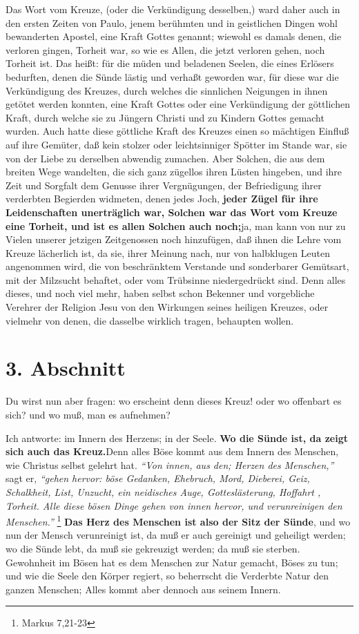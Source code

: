 Das Wort vom Kreuze, (oder die Verkündigung desselben,) ward daher auch in den
ersten Zeiten von Paulo, jenem berühmten und in geistlichen Dingen wohl
bewanderten Apostel, eine Kraft Gottes genannt; wiewohl es damals denen, die
verloren gingen, Torheit war, so wie es Allen, die jetzt verloren gehen, noch
Torheit ist. Das heißt: für die müden und beladenen Seelen, die eines Erlösers
bedurften, denen die Sünde lästig und verhaßt geworden war, für diese war die
Verkündigung des Kreuzes, durch welches die sinnlichen Neigungen in ihnen
getötet werden konnten, eine Kraft Gottes oder eine Verkündigung der göttlichen
Kraft, durch welche sie zu Jüngern Christi und zu Kindern Gottes gemacht wurden.
Auch hatte diese göttliche Kraft des Kreuzes einen so mächtigen Einfluß auf ihre
Gemüter, daß kein stolzer oder leichtsinniger Spötter im Stande war, sie von
der Liebe zu derselben abwendig zumachen. Aber Solchen, die aus dem breiten Wege
wandelten, die sich ganz zügellos ihren Lüsten hingeben, und ihre Zeit und
Sorgfalt dem Genusse ihrer Vergnügungen, der Befriedigung ihrer verderbten
Begierden widmeten, denen jedes Joch, \textbf{jeder Zügel für ihre Leidenschaften
unerträglich war, Solchen war das Wort vom Kreuze eine Torheit, und ist es
allen Solchen auch noch;}ja, man kann von nur zu Vielen unserer jetzigen
Zeitgenossen noch hinzufügen, daß ihnen die Lehre vom Kreuze lächerlich ist, da
sie, ihrer Meinung nach, nur von halbklugen Leuten angenommen wird, die von
beschränktem Verstande und sonderbarer Gemütsart, mit der Milzsucht
 behaftet,
oder vom Trübsinne niedergedrückt sind. Denn alles dieses, und noch viel mehr,
haben selbst schon Bekenner und vorgebliche Verehrer der Religion Jesu von den
Wirkungen seines heiligen Kreuzes, oder vielmehr von denen, die dasselbe
wirklich tragen, behaupten wollen.

\section{3. Abschnitt} \label{kap3_ab3} 

Du wirst nun aber fragen: wo erscheint denn dieses Kreuz! oder wo offenbart es
sich? und wo muß, man es aufnehmen?

Ich antworte: im Innern des Herzens; in der Seele. \textbf{Wo die Sünde ist, da zeigt
sich auch das Kreuz.}Denn alles Böse kommt aus dem Innern des Menschen, wie
Christus selbst gelehrt hat.
\textit{"`Von innen, aus den; Herzen des Menschen,"'} sagt er,
\textit{"`gehen hervor: böse Gedanken, Ehebruch, Mord, Dieberei, Geiz, Schalkheit,
List, Unzucht, ein neidisches Auge, Gotteslästerung, Hoffahrt%
, Torheit. Alle
diese bösen Dinge gehen von innen hervor, und verunreinigen den
Menschen."'}
\footnote{Markus 7,21-23}
\textbf{Das Herz des Menschen ist also der Sitz der Sünde},
 und wo nun der Mensch
verunreinigt ist, da muß er auch gereinigt und
geheiligt werden; wo die Sünde lebt, da muß sie gekreuzigt werden; da muß sie
sterben. Gewohnheit im Bösen hat es dem Menschen zur Natur gemacht, Böses zu
tun; und wie die Seele den Körper regiert, so beherrscht die Verderbte Natur
den ganzen Menschen; Alles kommt aber dennoch aus seinem Innern.

